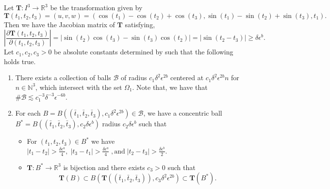 \documentclass[a4paper,reqno]{amsart}
\theoremstyle{definition}
\theoremstyle{remark}
\numberwithin{equation}{section}
\newcommand{\R}{{\mathbb {R}}}
\newcommand{\N}{{\mathbb N}}
\begin{document}
	Let $\boldsymbol{T}:I^3\to\R^3$ be the transformation given by
	\[\boldsymbol{T}(t_1,t_2,t_3)=(u,v,w)=(\cos(t_1)-\cos(t_2)+\cos(t_3),\sin(t_1)-\sin(t_2)+\sin(t_3),t_1).\]
	Then we have the Jacobian matrix of $\boldsymbol{T}$ satisfying,
	\begin{equation*}
		\left|\frac{\partial\boldsymbol{T}(t_1,t_2,t_3)}{\partial(t_1,t_2,t_3)}\right|=|\sin(t_2)\cos(t_3)-\sin(t_3)\cos(t_2)|=|\sin(t_2-t_3)|\geq\delta\epsilon^b.
	\end{equation*}
	Let $c_1,c_2,c_3>0$ be absolute constants determined by  such that the following holds true. 
	\begin{enumerate}
		\item There exists a collection of balls $\mathcal{B}$ of radius $c_1\delta^2\epsilon^{2b}$ centered at $c_1\delta^2\epsilon^{2b}{n}$ for ${n}\in\N^3$, which intersect with the set $\Omega_1$. Note that, we have that $\#\mathcal{B}\lesssim c_1^{-3}\delta^{-3}\epsilon^{-6b}$.
		\item For each $B=B((\bar t_1,\bar t_2,\bar t_3),c_1\delta^2\epsilon^{2b})\in\mathcal{B}$, we have a concentric ball $B^*=B((\bar t_1,\bar t_2,\bar t_3),c_2\delta\epsilon^b)$ radius $c_2\delta\epsilon^b$ such that
		\begin{itemize}
			\item For $(t_1,t_2,t_3)\in B^*$ we have $|t_1-t_2|>\frac{\delta\epsilon^a}{4},\;|t_3-t_1|>\frac{\delta\epsilon^a}{4}\;,\text{and}\;|t_2-t_3|>\frac{\delta\epsilon^b}{2}$.
			\item $\boldsymbol{T}:B^*\to\R^3$ is bijection and there exists $c_3>0$ such that
			\[\boldsymbol{T}(B)\subset B(\boldsymbol{T}((\bar t_1,\bar t_2,\bar t_3)),c_3\delta^2\epsilon^{2b})\subset\boldsymbol{T}(B^*).\]
		\end{itemize}
	\end{enumerate}
	
\end{document}
